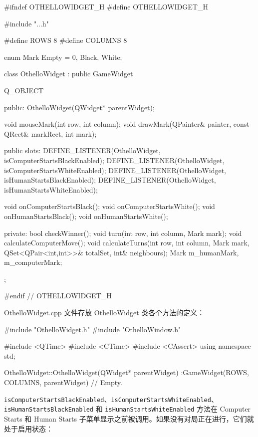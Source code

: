 \begin{codebox}
#ifndef OTHELLOWIDGET_H
#define OTHELLOWIDGET_H

#include "..\MainWindow\GameWidget.h"

#define ROWS    8
#define COLUMNS 8

enum Mark {Empty = 0, Black, White};

class OthelloWidget : public GameWidget {
  Q_OBJECT

  public:
    OthelloWidget(QWidget* parentWidget);

    void mouseMark(int row, int column);
    void drawMark(QPainter& painter,
                  const QRect& markRect, int mark);

  public slots:
    DEFINE_LISTENER(OthelloWidget, isComputerStartsBlackEnabled);
    DEFINE_LISTENER(OthelloWidget, isComputerStartsWhiteEnabled);
    DEFINE_LISTENER(OthelloWidget, isHumanStartsBlackEnabled);
    DEFINE_LISTENER(OthelloWidget, isHumanStartsWhiteEnabled);

    void onComputerStartsBlack();
    void onComputerStartsWhite();
    void onHumanStartsBlack();
    void onHumanStartsWhite();

  private:
    bool checkWinner();
    void turn(int row, int column, Mark mark);
    void calculateComputerMove();
    void calculateTurns(int row, int column, Mark mark,
                        QSet<QPair<int,int>>& totalSet,
                        int& neighbours);
    Mark m_humanMark, m_computerMark;
};

#endif // OTHELLOWIDGET_H
\end{codebox}

OthelloWidget.cpp 文件存放 OthelloWidget 类各个方法的定义：

\medskip{}

\begin{codebox}
#include "OthelloWidget.h"
#include "OthelloWindow.h"

#include <QTime>
#include <CTime>
#include <CAssert>
using namespace std;

OthelloWidget::OthelloWidget(QWidget* parentWidget)
 :GameWidget(ROWS, COLUMNS, parentWidget) {
  // Empty.
}
\end{codebox}

\texttt{isComputerStartsBlackEnabled}、\texttt{isComputerStartsWhiteEnabled}、\texttt{isHumanStartsBlackEnabled} 和 \texttt{isHumanStartsWhiteEnabled} 方法在 Computer Starts 和 Human Starts 子菜单显示之前被调用。如果没有对局正在进行，它们就处于启用状态：

